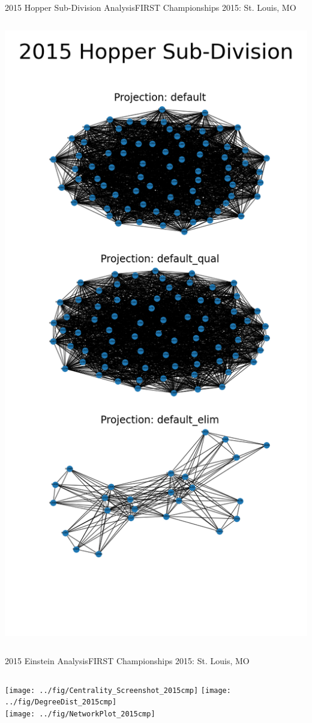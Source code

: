\documentclass[10pt]{beamer}
\begin{document}
\begin{frame}{2015 Hopper Sub-Division Analysis}{FIRST Championships 2015: St. Louis, MO}
\begin{columns}
		\includegraphics[height=0.85\textheight]{../fig/NetworkPlot_2015hop}
	\end{columns}
\end{frame}
\begin{frame}{2015 Einstein Analysis}{FIRST Championships 2015: St. Louis, MO}
	\begin{columns}
		\texttt{[image: ../fig/Centrality\_Screenshot\_2015cmp]}
		\texttt{[image: ../fig/DegreeDist\_2015cmp]}\\
		\texttt{[image: ../fig/NetworkPlot\_2015cmp]}
	\end{columns}
\end{frame}
\end{document}
